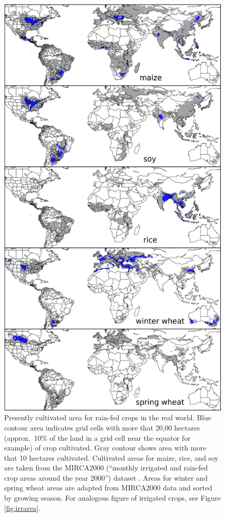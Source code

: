 \documentclass[preprint, 5p, times, twocolumn]{elsarticle}
\begin{document}
\begin{figure}[!htb]
\centering
   \includegraphics[width=0.95\linewidth]{croparea.png}
   \caption{Presently cultivated area for rain-fed crops in the real world. Blue contour area indicates grid cells with more that 20,00 hectares (approx.\ 10\% of the land in a grid cell near the equator for example) of crop cultivated. Gray contour shows area with more that 10 hectares cultivated. Cultivated areas for maize, rice, and soy are taken from the MIRCA2000 (``monthly irrigated and rain-fed crop areas around the year 2000'') dataset \citep{Portmann2010}. Areas for winter and spring wheat areas are adapted from MIRCA2000 data and sorted by growing season. For analogous figure of irrigated crops, see Figure \ref{fig:irrarea}.}
   \label{fig:crop_area}
\end{figure}
\end{document}
